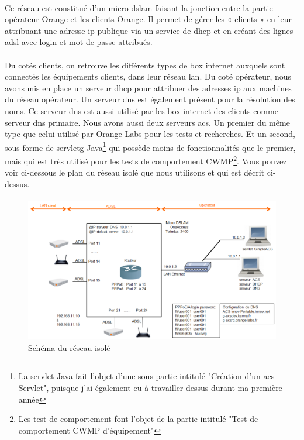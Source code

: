 \documentclass[12pt,a4paper]{report}
\begin{document}
\paragraph*{}Ce réseau est constitué d’un micro \gls{dslam} faisant la jonction entre la partie opérateur Orange et les clients Orange. Il permet de gérer les « clients » en leur attribuant une adresse \gls{ip} publique via un service de \gls{dhcp} et en créant des lignes \gls{adsl} avec login et mot de passe attribués. 
\paragraph*{}Du cotés clients, on retrouve les différents types de box internet auxquels sont connectés les équipements clients, dans leur réseau \gls{lan}. 
Du coté opérateur, nous avons mis en place un serveur \gls{dhcp} pour attribuer des adresses \gls{ip} aux machines du réseau opérateur. Un serveur \gls{dns} est également présent pour la résolution des noms. Ce serveur \gls{dns} est aussi utilisé par les box internet des clients comme serveur \gls{dns} primaire. Nous avons aussi deux serveurs \gls{acs}. Un premier du même type que celui utilisé par Orange Labs pour les tests et recherches. Et un second, sous forme de \gls{servletg} Java\footnote{La servlet Java fait l'objet d'une sous-partie intitulé "Création d'un \gls{acs} Servlet", puisque j'ai également eu à travailler dessus durant ma première année} qui possède moins de fonctionnalités que le premier, mais qui est très utilisé pour les tests de comportement CWMP\footnote{Les test de comportement font l'objet de la partie intitulé "Test de comportement CWMP d'équipement"}. Vous pouvez voir ci-dessous le plan du réseau isolé que nous utilisons et qui est décrit ci-dessus.
\paragraph*{}
\begin{figure}[!ht]
    \center
    \includegraphics[scale=0.7]{./img/reseau_isole.png}
    \caption{Schéma du réseau isolé}
\end{figure}
\end{document}

